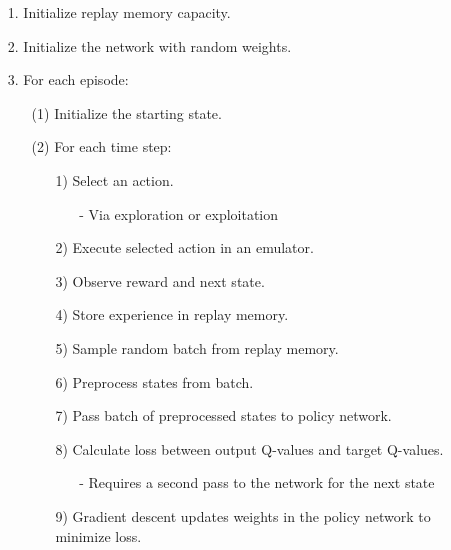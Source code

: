 \begin{itemize}
\setlength{\parskip}{0pt}
\item[1.]
Initialize replay memory capacity.

\item[2.]
Initialize the network with random weights.

\item[3.]
For each episode:
	\begin{itemize}
	\item[(1)]
	Initialize the starting state.

	\item[(2)]
	For each time step:
		\begin{itemize}
		\item[1)]
		Select an action.
			\begin{itemize}
			\item[-]
			Via exploration or exploitation
			\end{itemize}

		\item[2)]
		Execute selected action in an emulator.

		\item[3)]
		Observe reward and next state.

		\item[4)]
		Store experience in replay memory.

		\item[5)]
		Sample random batch from replay memory.

		\item[6)]
		Preprocess states from batch.

		\item[7)]
		Pass batch of preprocessed states to policy network.

		\item[8)]
		Calculate loss between output Q-values and target Q-values.
			\begin{itemize}
			\item[-]
			Requires a second pass to the network for the next state
			\end{itemize}

		\item[9)]
		Gradient descent updates weights in the policy network to minimize loss.
		\end{itemize}
	\end{itemize}
\end{itemize}



